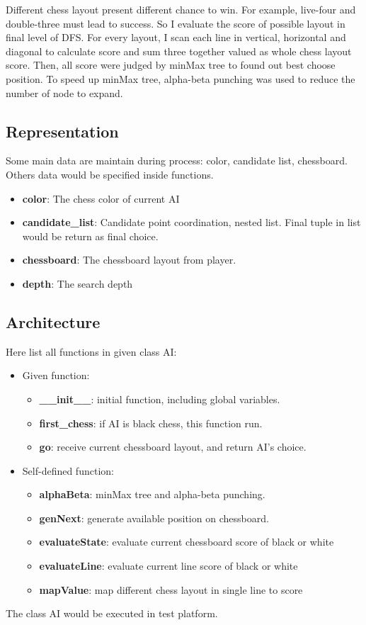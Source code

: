 \documentclass[conference,compsoc]{IEEEtran}
\begin{document}
Different chess layout present different chance to win. For example, live-four
and double-three must lead to success. So I evaluate the score of possible
layout in final level of DFS. For every layout, I scan each line in vertical,
horizontal and diagonal to calculate score and sum three together valued as
whole chess layout score. Then, all score were judged by minMax tree to found
out best choose position. To speed up minMax tree, alpha-beta punching was used
to reduce the number of node to expand.

\subsection{Representation}
Some main data are maintain during process: color, candidate list, chessboard.
Others data would be specified inside functions.

\begin{itemize}
  \item \textbf{color}: The chess color of current AI
  \item \textbf{candidate\_list}: Candidate point coordination, nested list.
  Final tuple in list would be return as final choice.
  \item \textbf{chessboard}: The chessboard  layout from player.
  \item \textbf{depth}: The search depth
\end{itemize}


\subsection{Architecture}
Here list all functions in given class AI:
\begin{itemize}
  \item Given function:
  \begin{itemize}
    \item \textbf{\_\_init\_\_}: initial function, including global variables.
    \item \textbf{first\_chess}: if AI is black chess, this function run.
    \item \textbf{go}: receive current chessboard layout, and return AI's choice.
  \end{itemize}
  \item Self-defined function:
    \begin{itemize}
      \item \textbf{alphaBeta}: minMax tree and alpha-beta punching.
      \item \textbf{genNext}: generate available position on chessboard.
      \item \textbf{evaluateState}: evaluate current chessboard score of black
	      or white
      \item \textbf{evaluateLine}: evaluate current line score of black or white
      \item \textbf{mapValue}: map different chess layout in single line to score
    \end{itemize}
\end{itemize}
The class AI would be executed in test platform.
\end{document}
